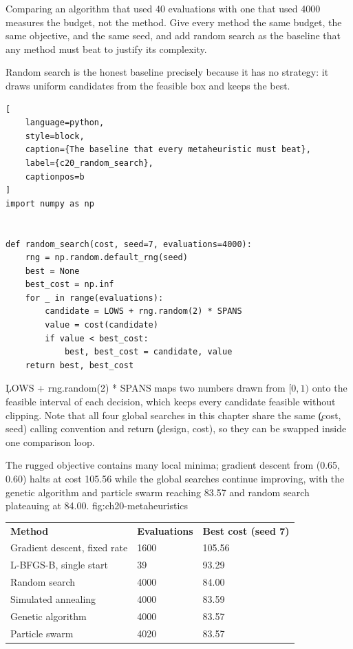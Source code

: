 
Comparing an algorithm that used 40 evaluations with one that used 4000 measures
the budget, not the method. Give every method the same budget, the same
objective, and the same seed, and add random search as the baseline that any
method must beat to justify its complexity.

Random search is the honest baseline precisely because it has no strategy: it
draws uniform candidates from the feasible box and keeps the best.

\begin{lstlisting}[
    language=python,
    style=block,
    caption={The baseline that every metaheuristic must beat},
    label={c20_random_search},
    captionpos=b
]
import numpy as np


def random_search(cost, seed=7, evaluations=4000):
    rng = np.random.default_rng(seed)
    best = None
    best_cost = np.inf
    for _ in range(evaluations):
        candidate = LOWS + rng.random(2) * SPANS
        value = cost(candidate)
        if value < best_cost:
            best, best_cost = candidate, value
    return best, best_cost
\end{lstlisting}

\c{LOWS + rng.random(2) * SPANS} maps two numbers drawn from $[0, 1)$ onto the
feasible interval of each decision, which keeps every candidate feasible without
clipping. Note that all four global searches in this chapter share the same
\c{(cost, seed)} calling convention and return \c{(design, cost)}, so they can be
swapped inside one comparison loop.

{The rugged objective contains many local minima; gradient descent from (0.65, 0.60) halts at cost 105.56 while the global searches continue improving, with the genetic algorithm and particle swarm reaching 83.57 and random search plateauing at 84.00.}
{fig:ch20-metaheuristics}

\begin{center}
\begin{tabular}{lll}
\textbf{Method} & \textbf{Evaluations} & \textbf{Best cost (seed 7)} \\
Gradient descent, fixed rate & 1600 & 105.56 \\
L-BFGS-B, single start & 39 & 93.29 \\
Random search & 4000 & 84.00 \\
Simulated annealing & 4000 & 83.59 \\
Genetic algorithm & 4000 & 83.57 \\
Particle swarm & 4020 & 83.57 \\
\end{tabular}
\end{center}

